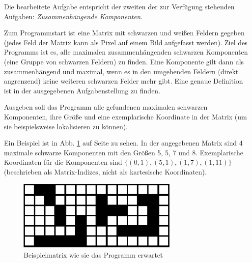 Die bearbeitete Aufgabe entspricht der zweiten der zur Verfügung stehenden Aufgaben: \textit{Zusammenhängende Komponenten}.

Zum Programmstart ist eine Matrix mit schwarzen und weißen Feldern gegeben (jedes Feld der Matrix kann als Pixel auf einem Bild aufgefasst werden). Ziel des Programms ist es, alle maximalen zusammenhängenden schwarzen Komponenten (eine Gruppe von schwarzen Feldern) zu finden. Eine Komponente gilt dann als zusammenhängend und maximal, wenn es in den umgebenden Feldern (direkt angrenzend) keine weiteren schwarzen Felder mehr gibt. Eine genaue Definition ist in der ausgegebenen Aufgabenstellung zu finden.

Ausgeben soll das Programm alle gefundenen maximalen schwarzen Komponenten, ihre Größe und eine exemplarische Koordinate in der Matrix (um sie beispielsweise lokalisieren zu können).

Ein Beispiel ist in Abb. \ref{fig:inputbsp} auf Seite \pageref{fig:inputbsp} zu sehen. In der angegebenen Matrix sind 4 maximale schwarze Komponenten mit den Größen 5, 5, 7 und 8. Exemplarische Koordinaten für die Komponenten sind $\{(0, 1), (5, 1), (1, 7), (1, 11)\}$ (beschrieben als Matrix-Indizes, nicht als kartesische Koordinaten).

\begin{figure}[tbhp]
	\centering
	\includegraphics[width=0.7\textwidth]{images/inputbsp.eps}
	\caption{Beispielmatrix wie sie das Programm erwartet}
	\label{fig:inputbsp}
\end{figure}
